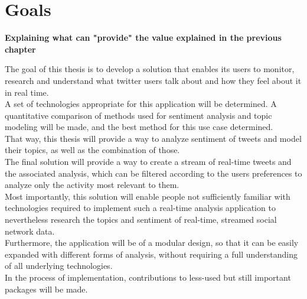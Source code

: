 \chapter{Goals}
\label{ch:goals}

\textbf{Explaining what can "provide" the value explained in the previous chapter}


The goal of this thesis is to develop a solution that enables its users to monitor,
research and understand what twitter users talk about and how they feel about it in real time.
\\
A set of technologies appropriate for this application will be determined.
A quantitative comparison of methods used for sentiment analysis and topic modeling will be made,
and the best method for this use case determined.
\\
That way, this thesis will provide a way to analyze sentiment of tweets and model their topics,
as well as the combination of those.
\\
The final solution will provide a way to create a stream of real-time tweets and the associated analysis,
which can be filtered according to the users preferences to analyze only the activity most relevant to them.
\\
Most importantly, this solution will enable people not sufficiently familiar with technologies required to
implement such a real-time analysis application to nevertheless research the topics and sentiment of real-time,
streamed social network data.
\\
Furthermore, the application will be  of a modular design, so that it can be easily expanded with different forms of analysis,
without requiring a full understanding of all underlying technologies.
\\
In the process of implementation,
contributions to less-used but still important packages will be made.

